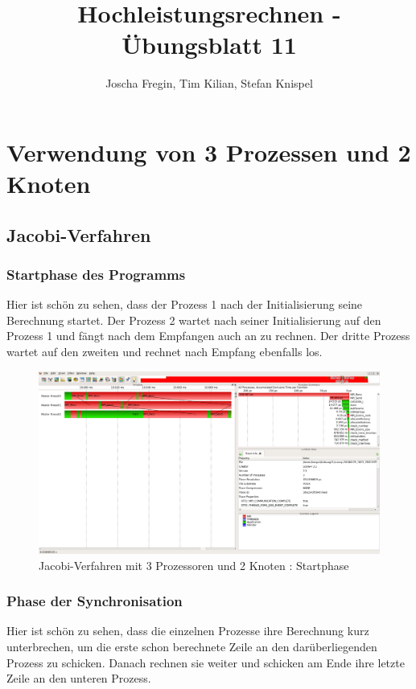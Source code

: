 \documentclass[11pt,a4paper]{article}
\begin{document}
\title{Hochleistungsrechnen - Übungsblatt 11}
\author{Joscha Fregin, Tim Kilian, Stefan Knispel}
\maketitle



\section{Verwendung von 3 Prozessen und 2 Knoten}



\subsection{Jacobi-Verfahren}


\subsubsection{Startphase des Programms}
Hier ist schön zu sehen, dass der Prozess 1 nach der Initialisierung seine Berechnung startet. Der Prozess 2 wartet nach seiner Initialisierung auf den Prozess 1 und fängt nach dem Empfangen auch an zu rechnen. Der dritte Prozess wartet auf den zweiten und rechnet nach Empfang ebenfalls los.
\begin{figure}[htbp] %
   \centering
   \includegraphics[width=1\textwidth]{Jacobi_1.png} 
   \caption{Jacobi-Verfahren mit 3 Prozessoren und 2 Knoten : Startphase}
   \label{Jacobi_1}
\end{figure}

\subsubsection{Phase der Synchronisation}
Hier ist schön zu sehen, dass die einzelnen Prozesse ihre Berechnung kurz unterbrechen, um die erste schon berechnete Zeile an den darüberliegenden Prozess zu schicken. Danach rechnen sie weiter und schicken am Ende ihre letzte Zeile an den unteren Prozess.
\end{document}
